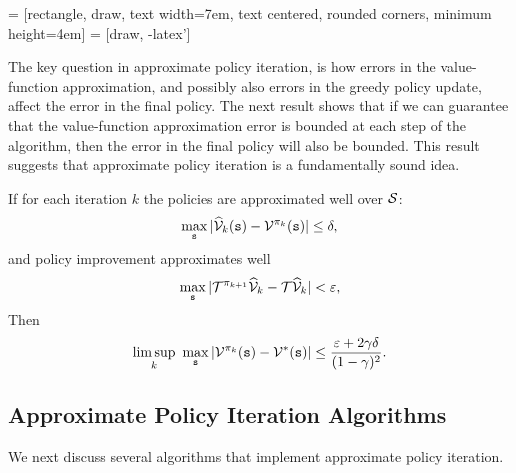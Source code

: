 \vspace{20pt}
 = [rectangle, draw,
    text width=7em, text centered, rounded corners, minimum height=4em]
 = [draw, -latex']
\vspace{20pt}

The key question in approximate policy iteration, is how errors in the value-function approximation, and possibly also errors in the greedy policy update, affect the error in the final policy. The next result shows that if we can guarantee that the value-function approximation error is bounded at each step of the algorithm, then the error in the final policy will also be bounded. This result suggests that approximate policy iteration is a fundamentally sound idea.

\begin{theorem}\label{thm:API}
If for each iteration $k$ the policies are approximated well over $\mathcal{S}$:
$$\max_{\tt s} |\widehat{\mathcal{V}}_k({\tt s})-\mathcal{V}^{\pi_k}({\tt s})| \le \delta,$$
and policy improvement approximates well
$$ \max_{\tt s} |\mathcal{T}^{\pi_{k+1}}\widehat{\mathcal{V}}_k - \mathcal{T}\widehat{\mathcal{V}}_k| < \varepsilon,$$
Then
$$ \limsup_k \ \max_{\tt s} | \mathcal{V}^{\pi_k}({\tt s})-\mathcal{V}^*({\tt s})| \le \frac{\varepsilon+2\gamma\delta}{(1-\gamma)^2}.$$
\end{theorem}

\subsection{Approximate Policy Iteration Algorithms}

We next discuss several algorithms that implement approximate policy iteration.


